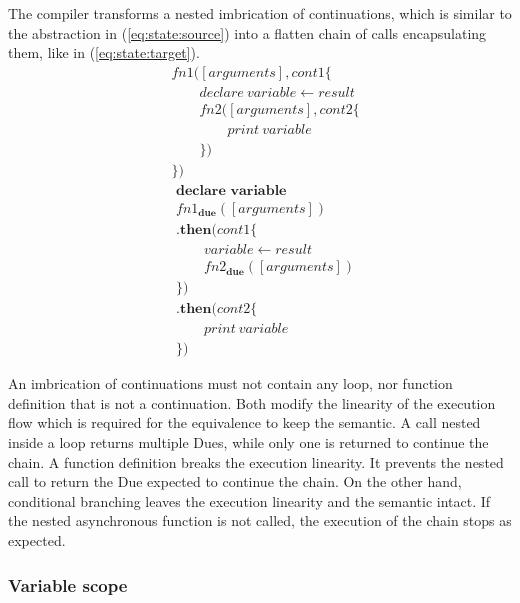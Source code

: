 The compiler transforms a nested imbrication of continuations, which is similar to the abstraction in (\ref{eq:state:source}) into a flatten chain of calls encapsulating them, like in (\ref{eq:state:target}).
\begin{align} \label{eq:state:source}
&fn1([arguments], cont1 \{\nonumber\\
&\qquad  declare ~ variable \leftarrow result\nonumber\\
&\qquad  fn2([arguments], cont2 \{\nonumber\\
&\qquad\qquad    print ~ variable\nonumber\\
&\qquad  \})\nonumber\\
&\})
\end{align}
\begin{align} \label{eq:state:target}
&\textbf{declare variable}\nonumber\\
&fn1_\textbf{due}([arguments])\nonumber\\
&\textbf{.then}(cont1\{\nonumber\\
&\qquad  variable \leftarrow result\nonumber\\
&\qquad  fn2_\textbf{due}([arguments])\nonumber\\
&\})\nonumber\\
&\textbf{.then}(cont2\{\nonumber\\
&\qquad  print ~ variable\nonumber\\
&\})
\end{align}

An imbrication of continuations must not contain any loop, nor function definition that is not a continuation.
Both modify the linearity of the execution flow which is required for the equivalence to keep the semantic.
A call nested inside a loop returns multiple Dues, while only one is returned to continue the chain.
A function definition breaks the execution linearity.
It prevents the nested call to return the Due expected to continue the chain.
On the other hand, conditional branching leaves the execution linearity and the semantic intact.
If the nested asynchronous function is not called, the execution of the chain stops as expected.


\subsubsection{Variable scope}


